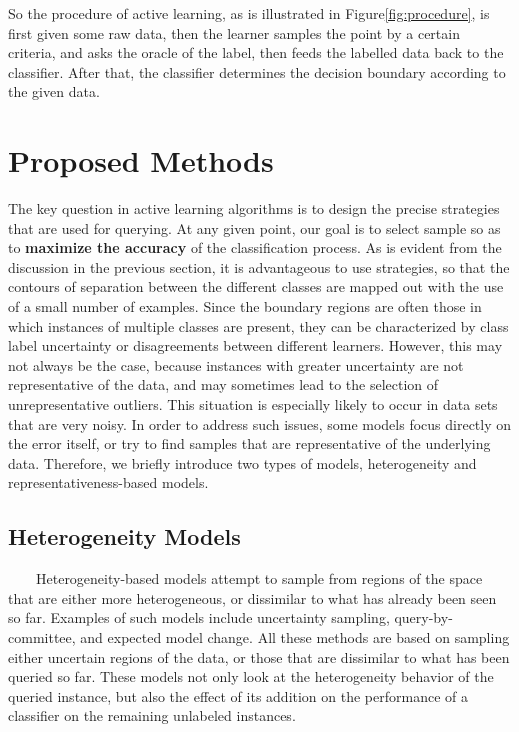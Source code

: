 \documentclass{acmtog}
\begin{document}
So the procedure of active learning, as is illustrated in Figure\ref{fig:procedure}, is first given some raw data, then the learner samples the point by  a certain criteria, and asks the oracle of the label, then feeds the labelled data back to the classifier.  After that, the classifier determines the decision boundary according to the given data.
\section{Proposed Methods}
\label{sec:proposed_methods}
The key question in active learning algorithms is to design the precise strategies that are used for querying. At any given point, our goal is to select sample so as to \textbf{maximize the accuracy} of the classification process. As is evident from the discussion in the previous section, it is advantageous to use strategies, so that the contours of separation between the different classes are mapped out with the use of a small number of examples. Since the boundary regions are often those in which instances of multiple classes are present, they can be characterized by class label uncertainty or disagreements between different learners. However, this may not always be the case, because instances with greater uncertainty are not representative of the data, and may sometimes lead to the selection
of unrepresentative outliers. This situation is especially likely to occur in data sets that are very noisy. In order to address such issues, some models focus directly on the error itself, or try to find samples that are representative of the underlying data. Therefore, we briefly introduce two types of models, heterogeneity and representativeness-based models.
\subsection{Heterogeneity Models}
\ \ \ \ Heterogeneity-based models\cite{aggarwal2014data} attempt to sample from regions of the space that are either more heterogeneous, or dissimilar to what has already been seen so far. Examples of such models include uncertainty sampling, query-by-committee, and expected model change. All these methods are based on sampling either uncertain regions of the data, or those that are dissimilar to what has been queried so far. These models not only look at the heterogeneity behavior of the queried instance, but also the effect of its addition on the performance of a classifier on the remaining unlabeled instances.
\end{document}
